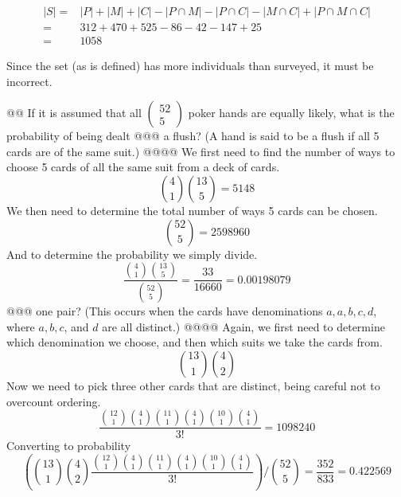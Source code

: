 \documentclass[10pt]{article}
\begin{document}
\begin{easylist}[enumerate]
        \[ \begin{aligned}
            |S| =& |P| + |M| + |C| - |P \cap M| - |P \cap C| - |M \cap C| + |P \cap M \cap C|\\
                =& 312 + 470 + 525 - 86 - 42 - 147 + 25\\
                =& 1058
        \end{aligned} \]

        Since the set (as is defined) has more individuals than surveyed, it must be incorrect.

    @@ If it is assumed that all $\begin{pmatrix}52\\5\end{pmatrix}$ poker hands are equally likely, what is the probability of being dealt
    @@@ a flush? (A hand is said to be a flush if all 5 cards are of the same suit.)
    @@@@ We first need to find the number of ways to choose 5 cards of all the same suit from a deck of cards.
        \[ \binom{4}{1} \binom{13}{5} = 5148\]
        We then need to determine the total number of ways 5 cards can be chosen.
        \[ \binom{52}{5} = 2598960 \]
        And to determine the probability we simply divide.
        \[ \frac{\binom{4}{1} \binom{13}{5}}{\binom{52}{5}} = \frac{33}{16660} = \boxed{0.00198079} \]
    @@@ one pair? (This occurs when the cards have denominations $a, a, b, c, d$, where $a, b, c$, and $d$ are all distinct.)
    @@@@ Again, we first need to determine which denomination we choose, and then which suits we take the cards from.
        \[ \binom{13}{1} \binom{4}{2} \]
        Now we need to pick three other cards that are distinct, being careful not to overcount ordering.
        \[ \frac{\binom{12}{1} \binom{4}{1} \binom{11}{1} \binom{4}{1} \binom{10}{1} \binom{4}{1}}{3!} = 1098240 \]
        Converting to probability
        \[ \left( \binom{13}{1} \binom{4}{2} \frac{\binom{12}{1} \binom{4}{1} \binom{11}{1} \binom{4}{1} \binom{10}{1} \binom{4}{1}}{3!} \right) \Big / \binom{52}{5} = \frac{352}{833} = \boxed{0.422569} \]


\end{easylist}
\end{document}
